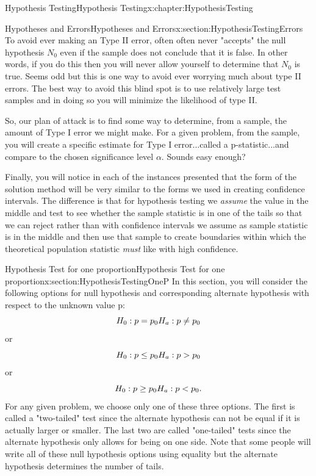 \documentclass[oneside,10pt,]{book}
\numberwithin{equation}{section}
\newcommand{\lt}{<}
\newcommand{\gt}{>}
\begin{document}
\begin{chapterptx}{Hypothesis Testing}{}{Hypothesis Testing}{}{}{x:chapter:HypothesisTesting}
\begin{sectionptx}{Hypotheses and Errors}{}{Hypotheses and Errors}{}{}{x:section:HypothesisTestingErrors}
To avoid ever making an Type II error, often often never "accepts" the null hypothesis \(N_0\) even if the sample does not conclude that it is false. In other words, if you do this then you will never allow yourself to determine that \(N_0\) is true.  Seems odd but this is one way to avoid ever worrying much about type II errors. The best way to avoid this blind spot is to use relatively large test samples and in doing so you will minimize the likelihood of type II.%
\par
So, our plan of attack is to find some way to determine, from a sample, the amount of Type I error we might make. For a given problem, from the sample, you will create a specific estimate for Type I error...called a p-statistic...and compare to the chosen significance level \(\alpha\). Sounds easy enough?%
\par
Finally, you will notice in each of the instances presented that the form of the solution method will be very similar to the forms we used in creating confidence intervals. The difference is that for hypothesis testing we \emph{assume} the value in the middle and test to see whether the sample statistic is in one of the tails so that we can reject rather than with confidence intervals we assume as sample statistic is in the middle and then use that sample to create boundaries within which the theoretical population statistic \emph{must} like with high confidence.%
\end{sectionptx}
%
%
\typeout{************************************************}
\typeout{************************************************}
%
\begin{sectionptx}{Hypothesis Test for one proportion}{}{Hypothesis Test for one proportion}{}{}{x:section:HypothesisTestingOneP}
In this section, you will consider the following options for null hypothesis and corresponding alternate hypothesis with respect to the unknown value p:%
\begin{equation*}
H_0 : p = p_0 \\ H_a : p \neq p_0
\end{equation*}
or%
\begin{equation*}
H_0 : p \le p_0 \\ H_a : p \gt p_0
\end{equation*}
or%
\begin{equation*}
H_0 : p \ge p_0 \\ H_a : p \lt p_0.
\end{equation*}
For any given problem, we choose only one of these three options. The first is called a "two-tailed" test since the alternate hypothesis can not be equal if it is actually larger or smaller. The last two are called "one-tailed" tests since the alternate hypothesis only allows for being on one side.  Note that some people will write all of these null hypothesis options using equality but the alternate hypothesis determines the number of tails.%

\end{sectionptx}
\end{chapterptx}
\end{document}
